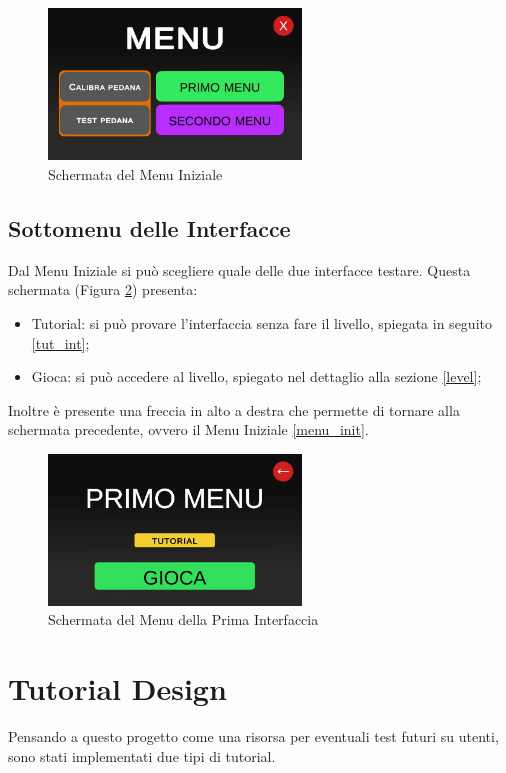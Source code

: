 \documentclass[target=bach,aauheader=]{thud}
\begin{document}
\begin{figure}[h]
    \centering
    \includegraphics[width=0.60\textwidth]{menu_screen}
    \caption{Schermata del Menu Iniziale}
    \label{fig:menu_screen}
\end{figure}

\subsection{Sottomenu delle Interfacce}
\label{menu_int}
Dal Menu Iniziale si può scegliere quale delle due interfacce testare.
Questa schermata (Figura \ref{fig:first_menu}) presenta:
\begin{itemize}
    \item Tutorial: si può provare l'interfaccia senza fare il livello, spiegata in seguito \ref{tut_int};
    \item Gioca: si può accedere al livello, spiegato nel dettaglio alla sezione \ref{level};
\end{itemize}
Inoltre è presente una freccia in alto a destra che permette di tornare alla schermata precedente, ovvero il Menu Iniziale \ref{menu_init}.

\begin{figure}[h]
    \centering
    \includegraphics[width=0.60\textwidth]{first_menu}
    \caption{Schermata del Menu della Prima Interfaccia}
    \label{fig:first_menu}
\end{figure}

\section{Tutorial Design}
Pensando a questo progetto come una risorsa per eventuali test futuri su utenti, sono stati implementati due tipi di tutorial.
\end{document}
